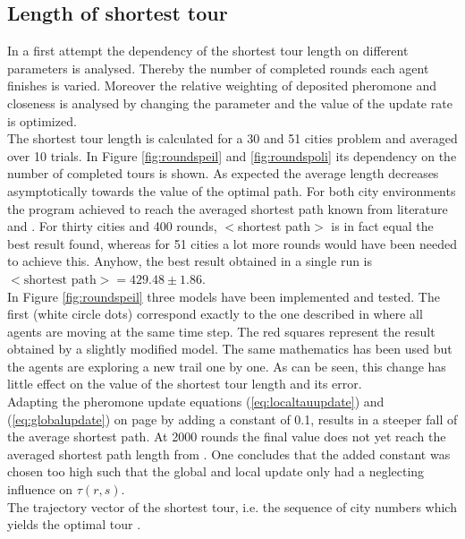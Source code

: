 

\subsection{Length of shortest tour}

In a first attempt the dependency of the shortest tour length on different parameters is analysed. Thereby the number of completed rounds each agent finishes is varied. Moreover the relative weighting of deposited pheromone and closeness is analysed by changing the parameter \beta and the value of the update rate \alpha is optimized. \\
The shortest tour length is calculated for a 30 and 51 cities problem and averaged over 10 trials. In Figure \ref{fig:roundspeil} and \ref{fig:roundspoli} its dependency on the number of completed tours is shown. As expected the average length decreases asymptotically towards the value of the optimal path. For both city environments the program achieved to reach the averaged shortest path known from literature \cite{paper} and \cite{oli}. For thirty cities and 400 rounds, $<$shortest path$>$ is in fact equal the best result found, whereas for 51 cities a lot more rounds would have been needed to achieve this. Anyhow, the best result obtained in a single run is $<\text{shortest path}>=429.48 \pm 1.86$.\\In Figure \ref{fig:roundspeil} three models have been implemented and tested. The first (white circle dots) correspond exactly to the one described in \cite{paper} where all agents are moving at the same time step. The red squares represent the result obtained by a slightly modified model. The same mathematics has been used but the agents are exploring a new trail one by one. As can be seen, this change has little effect on the value of the shortest tour length and its error.\\ Adapting the pheromone update equations (\ref{eq:localtauupdate}) and (\ref{eq:globalupdate}) on page \pageref{sec:model} by adding a constant of 0.1, results in a steeper fall of the average shortest path. At 2000 rounds the final value does not yet reach the averaged shortest path length from \cite{paper}. One concludes that the added constant was chosen too high such that the global and local update only had a neglecting influence on $\tau(r,s)$.\\

The trajectory vector of the shortest tour, i.e. the sequence of city numbers which yields the optimal tour .

